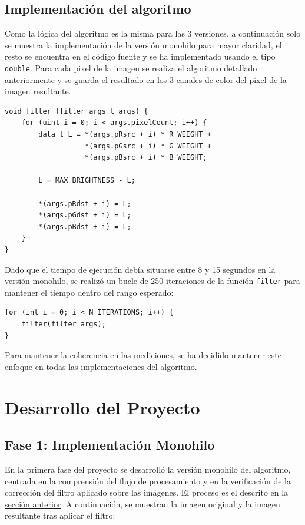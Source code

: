 \documentclass[11pt,a4paper]{article}
\begin{document}
\subsection{Implementación del algoritmo}
Como la lógica del algoritmo es la misma para las 3 versiones, a continuación solo 
se muestra la implementación de la versión monohilo para mayor claridad, el resto se 
encuentra en el código fuente y se ha implementado usando el tipo \texttt{double}. Para cada pixel de la imagen se realiza el algoritmo detallado anteriormente y se 
guarda el resultado en los 3 canales de color del píxel de la imagen resultante.

\begin{lstlisting}[style=cppStyle]
void filter (filter_args_t args) {
    for (uint i = 0; i < args.pixelCount; i++) {
        data_t L = *(args.pRsrc + i) * R_WEIGHT + 
                   *(args.pGsrc + i) * G_WEIGHT + 
                   *(args.pBsrc + i) * B_WEIGHT;
        
        L = MAX_BRIGHTNESS - L;

        *(args.pRdst + i) = L;
        *(args.pGdst + i) = L;
        *(args.pBdst + i) = L;
    }
}
\end{lstlisting}
\vspace{2ex}

\noindent Dado que el tiempo de ejecución debía situarse entre 8 y 15 segundos en la versión monohilo, se realizó un bucle de 250 iteraciones de la función \texttt{filter} para mantener el tiempo dentro del rango esperado:
\begin{lstlisting}[style=cppStyle]
for (int i = 0; i < N_ITERATIONS; i++) {
    filter(filter_args);
}
\end{lstlisting}
Para mantener la coherencia en las mediciones, se ha decidido mantener este enfoque en todas las implementaciones del algoritmo.
\vspace{2ex}




\newpage

\section{Desarrollo del Proyecto}
\subsection{Fase 1: Implementación Monohilo}
En la primera fase del proyecto se desarrolló la versión monohilo del algoritmo, centrada en la comprensión del flujo de procesamiento y en la verificación de la corrección del filtro aplicado sobre las imágenes. El proceso es el descrito en la \hyperref[sec:desarrollo-algoritmo]{sección anterior}. A continuación, se muestran la imagen original y la imagen resultante tras aplicar el filtro:
\end{document}
